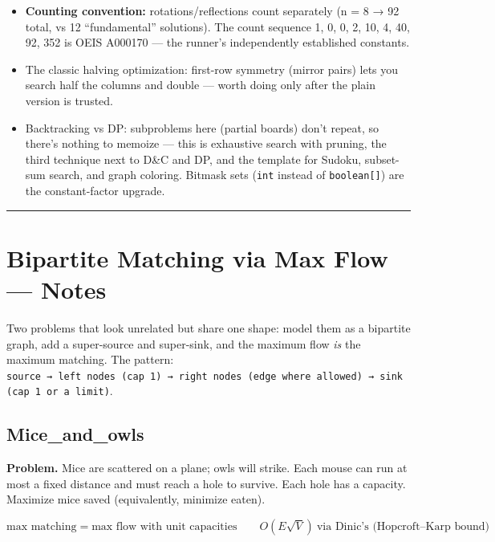 \documentclass[
  10pt,
  letterpaper,
  onecolumn]{article}
\providecommand{\tightlist}{%
  \setlength{\itemsep}{0pt}\setlength{\parskip}{0pt}}
\begin{document}
\begin{itemize}
\tightlist
\item
  \textbf{Counting convention:} rotations/reflections count separately
  (n = 8 → 92 total, vs 12 ``fundamental'' solutions). The count
  sequence 1, 0, 0, 2, 10, 4, 40, 92, 352 is OEIS A000170 --- the
  runner's independently established constants.
\item
  The classic halving optimization: first-row symmetry (mirror pairs)
  lets you search half the columns and double --- worth doing only after
  the plain version is trusted.
\item
  Backtracking vs DP: subproblems here (partial boards) don't repeat, so
  there's nothing to memoize --- this is exhaustive search with pruning,
  the third technique next to D\&C and DP, and the template for Sudoku,
  subset-sum search, and graph coloring. Bitmask sets (\texttt{int}
  instead of \texttt{boolean{[}{]}}) are the constant-factor upgrade.
\end{itemize}

\begin{center}\rule{0.5\linewidth}{0.5pt}\end{center}

\hypertarget{bipartite-matching-via-max-flow-notes}{%
\section{Bipartite Matching via Max Flow ---
Notes}\label{bipartite-matching-via-max-flow-notes}}

Two problems that look unrelated but share one shape: model them as a
bipartite graph, add a super-source and super-sink, and the maximum flow
\emph{is} the maximum matching. The pattern:
\texttt{source\ →\ left\ nodes\ (cap\ 1)\ →\ right\ nodes\ (edge\ where\ allowed)\ →\ sink\ (cap\ 1\ or\ a\ limit)}.

\hypertarget{mice_and_owls}{%
\subsection{Mice\_and\_owls}\label{mice_and_owls}}

\textbf{Problem.} Mice are scattered on a plane; owls will strike. Each
mouse can run at most a fixed distance and must reach a hole to survive.
Each hole has a capacity. Maximize mice saved (equivalently, minimize
eaten).

\begin{equation*}
\text{max matching} = \text{max flow with unit capacities}
\qquad
O(E\sqrt{V})\ \text{via Dinic's (Hopcroft--Karp bound)}
\end{equation*}
\end{document}
